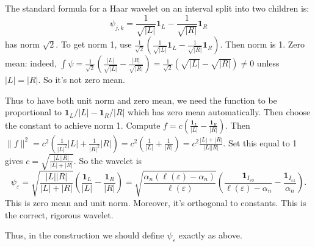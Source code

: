 \documentclass[11pt,a4paper]{article}
\begin{document}
The standard formula for a Haar wavelet on an interval split into two children is:
\[
\psi_{j,k} = \frac{1}{\sqrt{|L|}} \mathbf{1}_L - \frac{1}{\sqrt{|R|}} \mathbf{1}_R
\]
has norm \(\sqrt{2}\). To get norm 1, use \(\frac{1}{\sqrt{2}} \left( \frac{1}{\sqrt{|L|}} \mathbf{1}_L - \frac{1}{\sqrt{|R|}} \mathbf{1}_R \right)\). Then norm is 1. Zero mean: indeed, \(\int \psi = \frac{1}{\sqrt{2}} ( \frac{|L|}{\sqrt{|L|}} - \frac{|R|}{\sqrt{|R|}} ) = \frac{1}{\sqrt{2}} (\sqrt{|L|} - \sqrt{|R|}) \neq 0\) unless \(|L|=|R|\). So it's not zero mean.

Thus to have both unit norm and zero mean, we need the function to be proportional to \(\mathbf{1}_L/|L| - \mathbf{1}_R/|R|\) which has zero mean automatically. Then choose the constant to achieve norm 1. Compute \(f = c ( \frac{\mathbf{1}_L}{|L|} - \frac{\mathbf{1}_R}{|R|} )\). Then \(\|f\|^2 = c^2 ( \frac{1}{|L|^2}|L| + \frac{1}{|R|^2}|R| ) = c^2 ( \frac{1}{|L|} + \frac{1}{|R|} ) = c^2 \frac{|L|+|R|}{|L||R|}\). Set this equal to 1 gives \(c = \sqrt{ \frac{|L||R|}{|L|+|R|} }\). So the wavelet is
\[
\psi_\varepsilon = \sqrt{ \frac{|L||R|}{|L|+|R|} } \left( \frac{\mathbf{1}_L}{|L|} - \frac{\mathbf{1}_R}{|R|} \right)
= \sqrt{ \frac{\alpha_n(\ell(\varepsilon)-\alpha_n)}{\ell(\varepsilon)} } \left( \frac{\mathbf{1}_{I_{\varepsilon0}}}{\ell(\varepsilon)-\alpha_n} - \frac{\mathbf{1}_{I_{\varepsilon1}}}{\alpha_n} \right).
\]
This is zero mean and unit norm. Moreover, it's orthogonal to constants. This is the correct, rigorous wavelet.

Thus, in the construction we should define \(\psi_\varepsilon\) exactly as above.
\end{document}
